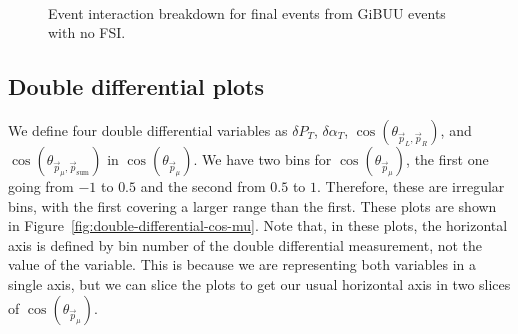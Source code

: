\documentclass{article}
\newcommand{\vm}{\vec{p}_\mu}
\newcommand{\vlp}{\vec{p}_L}
\newcommand{\vrp}{\vec{p}_R}
\newcommand{\vtp}{\vec{p}_{\text{sum}}}
\begin{document}
\begin{figure}
     \\
    \caption{Event interaction breakdown for final events from GiBUU events with no FSI.}
    \label{fig:gibuu-no-fsi}
\end{figure}

\clearpage

\subsection{Double differential plots}

We define four double differential variables as $\delta P_T$, $\delta \alpha_T$, $\cos\left(\theta_{\vlp,\vrp}\right)$, 
and $\cos\left(\theta_{\vm,\vtp}\right)$ in $\cos(\theta_{\vec{p}_{\mu}})$. We have two bins for $\cos(\theta_{\vec{p}_{\mu}})$, the first one 
going from $-1$ to $0.5$ and the second from $0.5$ to $1$. Therefore, these are irregular bins, with the first 
covering a larger range than the first. These plots are shown in Figure~\ref{fig:double-differential-cos-mu}. Note that, 
in these plots, the horizontal axis is defined by bin number of the double differential measurement, not the value of the
variable. This is because we are representing both variables in a single axis, but we can slice the plots to get our usual 
horizontal axis in two slices of $\cos(\theta_{\vec{p}_{\mu}})$.
\end{document}
